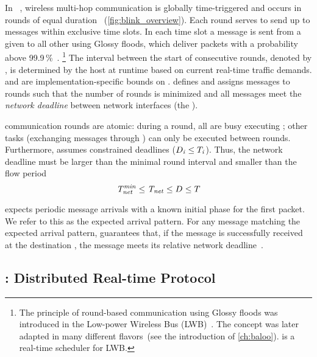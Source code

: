 In \blink~\cite{zimmerling2017Blink}, wireless multi-hop communication is globally time-triggered and occurs in {rounds} of equal {duration} \rlength~(\cref{fig:blink_overview}).
Each round serves to send up to \nslotsmax messages within exclusive time slots.
In each time slot a message is sent from a given \cp to all other \CPs using Glossy floods, which deliver packets with a probability above 99.9\,\%~\cite{ferrari2011Glossy}.%
%
\footnote{The principle of round-based communication using Glossy floods was introduced in the Low-power Wireless Bus (LWB)~\cite{ferrari2012LWB}. The concept was later adapted in many different flavors~(see the introduction of \cref{ch:baloo}).
\blink is a real-time scheduler for LWB.}
%
The interval between the start of consecutive rounds, denoted by \rperiod, is determined by the host at runtime based on current real-time traffic demands. \rperiodmin and \rperiodmax are implementation-specific bounds on \rperiod.
\blink defines \rperiod and assigns messages to rounds such that the number of rounds is minimized and all messages meet the \emph{network deadline} \ndeadlinei between network interfaces (\ie the \CPs).

\blink communication rounds are atomic: during a round, all \CPs are busy executing \blink; other tasks (\eg exchanging messages through \bolt) can only be executed between rounds.
Furthermore, \blink assumes constrained deadlines ($D_{\mathit{i}} \leq T_{\mathit{i}}$).
Thus, the network deadline \ndeadlineany must be larger than the minimal round interval and smaller than the flow period \periodany
\begin{equation}
  \mathit{T_{net}^{min}} \leq \mathit{T_{net}} \leq D_{\mathit{}} \leq T_{\mathit{}}
\end{equation}

\blink expects periodic message arrivals with a known initial phase for the first packet.
We refer to this as the expected arrival pattern.
For any message matching the expected arrival pattern,
\blink guarantees that, if the message is successfully received at the destination \cp, the message meets its relative network deadline~\ndeadlineany.%

\squarepar{%
  However, we must consider the complete system:
  (i)~the message release from the \APs is sporadic with jitter, and
  (ii)~\APs and \CPs operate independently~(\feature{Composability}). Thus, there is a mismatch between the periodic arrival pattern assumed by \blink and the actual message arrival at the \CPs.%
}

\subsection{\DRP: Distributed Real-time Protocol}
\label{subsec:drp}

